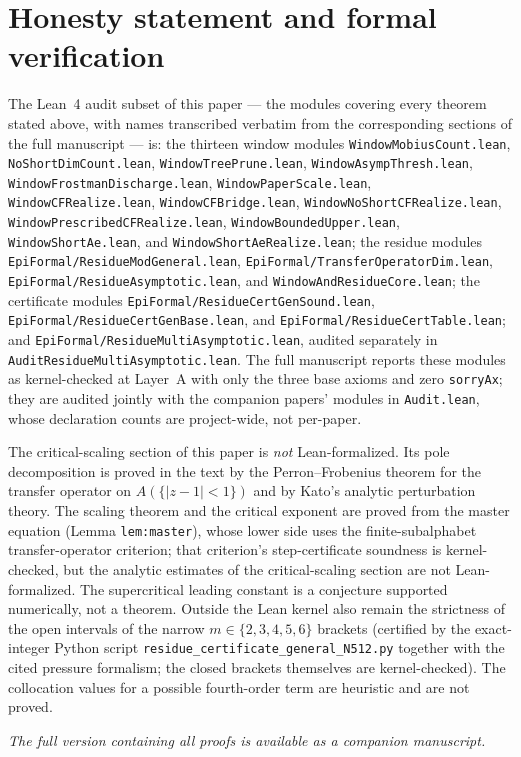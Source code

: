 \section*{Honesty statement and formal verification}

The Lean~4 audit subset of this paper --- the modules covering every theorem
stated above, with names transcribed verbatim from the corresponding sections
of the full manuscript --- is: the thirteen window modules
\texttt{WindowMobiusCount.lean}, \texttt{NoShortDimCount.lean},
\texttt{WindowTreePrune.lean}, \texttt{WindowAsympThresh.lean},
\texttt{WindowFrostmanDischarge.lean}, \texttt{WindowPaperScale.lean},
\texttt{WindowCFRealize.lean}, \texttt{WindowCFBridge.lean},
\texttt{WindowNoShortCFRealize.lean}, \texttt{WindowPrescribedCFRealize.lean},
\texttt{WindowBoundedUpper.lean}, \texttt{WindowShortAe.lean}, and
\texttt{WindowShortAeRealize.lean}; the residue modules
\texttt{EpiFormal/ResidueModGeneral.lean},
\texttt{EpiFormal/TransferOperatorDim.lean}, \texttt{EpiFormal/ResidueAsymptotic.lean}, and
\texttt{WindowAndResidueCore.lean}; the certificate modules
\texttt{EpiFormal/ResidueCertGenSound.lean},
\texttt{EpiFormal/ResidueCertGenBase.lean}, and
\texttt{EpiFormal/ResidueCertTable.lean}; and
\texttt{EpiFormal/ResidueMultiAsymptotic.lean}, audited separately in
\texttt{AuditResidueMultiAsymptotic.lean}. The full manuscript reports these
modules as kernel-checked at Layer~A with only the three base axioms and zero
\texttt{sorryAx}; they are audited jointly with the companion papers' modules
in \texttt{Audit.lean}, whose declaration counts are project-wide, not
per-paper.

The critical-scaling section of this paper is \emph{not} Lean-formalized. Its
pole decomposition is proved in the text by the Perron--Frobenius theorem for
the transfer operator on $A(\{|z-1|<1\})$ and by Kato's analytic perturbation
theory. The scaling theorem and the critical exponent are proved from the
master equation (Lemma \texttt{lem:master}), whose lower side uses the
finite-subalphabet transfer-operator criterion; that criterion's
step-certificate soundness is kernel-checked, but the analytic estimates of
the critical-scaling section are not Lean-formalized. The supercritical leading constant is a conjecture
supported numerically, not a theorem. Outside the Lean kernel also remain the
strictness of the open intervals of the narrow $m\in\{2,3,4,5,6\}$ brackets
(certified by the exact-integer Python script
\texttt{residue\_certificate\_general\_N512.py} together with the cited
pressure formalism; the closed brackets themselves are kernel-checked). The
collocation values for a possible fourth-order term are heuristic and are not
proved.

\emph{The full version containing all proofs is available as a companion manuscript.}
